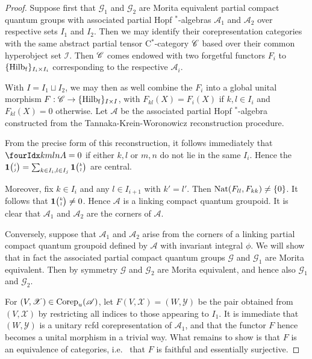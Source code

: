 \begin{proof} Suppose first that $\mathscr{G}_1$ and $\mathscr{G}_2$ are Morita equivalent partial compact quantum groups with associated partial Hopf $^*$-algebras $\mathscr{A}_1$ and $\mathscr{A}_2$ over respective sets $I_1$ and $I_2$. Then we may identify their corepresentation categories with the same abstract partial tensor C$^*$-category $\mathscr{C}$ based over their common hyperobject set $\mathscr{I}$. Then $\mathscr{C}$ comes endowed with two forgetful functors $F_i$ to $\{\mathrm{Hilb}_{\operatorname{\mathrm{f}}}\}_{I_i\times I_i}$ corresponding to the respective $\mathscr{A}_i$.

With $I = I_1\sqcup I_2$, we may then as well combine the $F_i$ into a global unital morphism $F:\mathscr{C} \rightarrow \{\mathrm{Hilb}_{\operatorname{\mathrm{f}}}\}_{I\times I}$, with $F_{kl}(X)=F_i(X)$ if $k,l\in I_i$ and $F_{kl}(X)=0$ otherwise. Let $\mathscr{A}$ be the associated partial Hopf $^*$-algebra constructed from the Tannaka-Krein-Woronowicz reconstruction procedure. 

From the precise form of this reconstruction, it follows immediately that $\Gr{A}{k}{l}{m}{n} =0$ if either $k,l$ or $m,n$ do not lie in the same $I_i$. Hence the $\mathbf{1}{\tiny {\begin{pmatrix} i\\j\end{pmatrix}}} = \sum_{k\in I_i,l\in I_j} \mathbf{1}{\tiny {\begin{pmatrix} k\\l\end{pmatrix}}}$ are central. 

Moreover, fix $k\in I_i$ and any $l\in I_{i+1}$ with $k'=l'$. Then $\operatorname{\mathrm{Nat}}(F_{ll},F_{kk})\neq \{0\}$. It follows that $\mathbf{1}{\tiny {\begin{pmatrix} k\\l\end{pmatrix}}}\neq 0$. Hence $\mathscr{A}$ is a linking compact quantum groupoid. It is clear that $\mathscr{A}_1$ and $\mathscr{A}_2$ are the corners of $\mathscr{A}$. 

Conversely, suppose that $\mathscr{A}_1$ and $\mathscr{A}_2$ arise from the corners of a linking partial compact quantum groupoid defined by $\mathscr{A}$ with invariant integral $\phi$. We will show that in fact the associated partial compact quantum groups $\mathscr{G}$ and $\mathscr{G}_1$ are Morita equivalent. Then by symmetry $\mathscr{G}$ and $\mathscr{G}_2$ are Morita equivalent, and hence also $\mathscr{G}_1$ and $\mathscr{G}_2$.

For $(V,\mathscr{X}) \in \mathrm{Corep}_u(\mathscr{A})$, let $F(V,\mathscr{X}) = (W,\mathscr{Y})$ be the pair obtained from $(V,\mathscr{X})$ by restricting all indices to those appearing to $I_1$. It is immediate that $(W,\mathscr{Y})$ is a unitary rcfd corepresentation of $\mathscr{A}_1$, and that the functor $F$ hence becomes a unital morphism in a trivial way. What remains to show is that $F$ is an equivalence of categories, i.e.~ that $F$ is faithful and essentially surjective. 


\end{proof}
